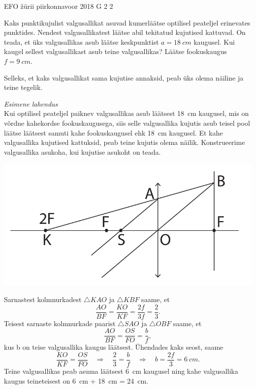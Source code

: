 {EFO žürii} %
{piirkonnavoor} %
{2018} %
{G 2} %
{2} %
{
\ifStatement
Kaks punktikujulist valgusallikat asuvad kumerläätse optilisel peateljel erinevates punktides. Nendest valgusallikatest läätse abil tekitatud kujutised kattuvad. On teada, et üks valgusallikas asub läätse keskpunktist $a=\SI{18}{cm}$ kaugusel. Kui kaugel sellest valgusallikast asub teine valgusallikas? Läätse fookuskaugus $f=\SI{9}{cm}$. 
\fi


\ifHint
Selleks, et kaks valgusallikat sama kujutise annaksid, peab üks olema näiline ja teine tegelik.
\fi


\ifSolution
\emph{Esimene lahendus}\\
Kui optilisel peateljel paiknev valgusallikas asub läätsest \SI{18}{cm} kaugusel, mis on võrdne kahekordse fookuskaugusega, siis selle valgusallika kujutis asub teisel pool läätse läätsest samuti kahe fookuskaugusel ehk \SI{18}{cm} kaugusel. Et kahe valgusallika kujutised kattuksid, peab teine kujutis olema näilik.
Konstrueerime valgusallika asukoha, kui kujutise asukoht on teada. 
 \vspace{-10pt}
 \begin{center}
 \includegraphics[width=0.7\linewidth]{2018-v2g-02-valgusallikaslah}
 \end{center}
 \vspace{-10pt}

Sarnastest kolmnurkadest $\triangle KAO$ ja $\triangle KBF$ saame, et
\[ \frac{AO}{BF} = \frac{KO}{KF} = \frac{2f}{3f} = \frac{2}{3}. \]
Teisest sarnaste kolmnurkade paarist $\triangle SAO$ ja $\triangle OBF$ saame, et
\[ \frac{AO}{BF} = \frac{OS}{FO} = \frac{b}{f}, \]
kus b on teise valgusallika kaugus läätsest. Ühendades kaks seost, saame
\[ \frac{KO}{KF}=\frac{OS}{FO} \quad\Rightarrow\quad \frac{2}{3} = \frac{b}{f} \quad\Rightarrow\quad b = \frac{2f}{3} = \SI{6}{cm}. \]
Teine valgusallikas peab asuma läätsest \SI{6}{cm} kaugusel ning kahe valgusallika kaugus teineteisest on \SI{6}{cm} + \SI{18}{cm} = \SI{24}{cm}.

}
